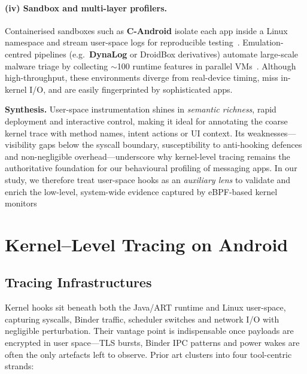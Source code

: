 \documentclass[a4paper,12pt]{report}
\begin{document}
\paragraph{(iv) Sandbox and multi-layer profilers.}
Containerised sandboxes such as \textbf{C-Android} isolate each app inside a
Linux namespace and stream user-space logs for reproducible
testing~\cite{candroid2019}.  Emulation-centred pipelines (e.g.\ \textbf{DynaLog}
or DroidBox derivatives) automate large-scale malware triage by collecting
$\sim$100 runtime features in parallel VMs~\cite{dynalog2016}.  Although
high-throughput, these environments diverge from real-device timing,
miss in-kernel I/O, and are easily fingerprinted by sophisticated apps.

\medskip
\noindent\textbf{Synthesis.}
User-space instrumentation shines in \emph{semantic richness}, rapid
deployment and interactive control, making it ideal for annotating the coarse
kernel trace with method names, intent actions or UI context.  Its
weaknesses—visibility gaps below the syscall boundary, susceptibility to
anti-hooking defences and non-negligible overhead—underscore why kernel-level
tracing remains the authoritative foundation for our behavioural profiling of
messaging apps.  In our study, we therefore treat user-space hooks as an
\emph{auxiliary lens} to validate and enrich the low-level, system-wide evidence
captured by eBPF-based kernel monitors
\section{Kernel–Level Tracing on Android}

\subsection{Tracing Infrastructures}
Kernel hooks sit beneath both the Java/ART runtime and Linux user-space, capturing syscalls, Binder traffic, scheduler switches and network I/O with negligible perturbation.  Their vantage point is indispensable once payloads are encrypted in user space—TLS bursts, Binder IPC patterns and power wakes are often the only artefacts left to observe.  Prior art clusters into four tool-centric strands:
\end{document}
